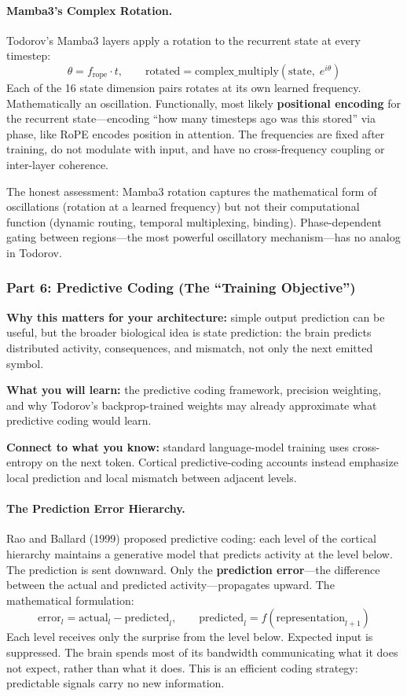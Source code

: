 \documentclass[11pt,a4paper]{article}
\begin{document}
\paragraph{Mamba3's Complex Rotation.}

Todorov's Mamba3 layers apply a rotation to the recurrent state at every timestep:
\[
  \theta = f_{\mathrm{rope}} \cdot t, \qquad
  \mathrm{rotated} = \mathrm{complex\_multiply}\!\left(\mathrm{state},\; e^{i\theta}\right)
\]
Each of the 16 state dimension pairs rotates at its own learned frequency. Mathematically an oscillation. Functionally, most likely \textbf{positional encoding} for the recurrent state---encoding ``how many timesteps ago was this stored'' via phase, like RoPE encodes position in attention. The frequencies are fixed after training, do not modulate with input, and have no cross-frequency coupling or inter-layer coherence.

The honest assessment: Mamba3 rotation captures the mathematical form of oscillations (rotation at a learned frequency) but not their computational function (dynamic routing, temporal multiplexing, binding). Phase-dependent gating between regions---the most powerful oscillatory mechanism---has no analog in Todorov.

\subsubsection{Part 6: Predictive Coding (The ``Training Objective'')}

\textbf{Why this matters for your architecture:} simple output prediction can be useful, but the broader biological idea is state prediction: the brain predicts distributed activity, consequences, and mismatch, not only the next emitted symbol.

\textbf{What you will learn:} the predictive coding framework, precision weighting, and why Todorov's backprop-trained weights may already approximate what predictive coding would learn.

\textbf{Connect to what you know:} standard language-model training uses cross-entropy on the next token. Cortical predictive-coding accounts instead emphasize local prediction and local mismatch between adjacent levels.

\paragraph{The Prediction Error Hierarchy.}

Rao and Ballard (1999) proposed predictive coding: each level of the cortical hierarchy maintains a generative model that predicts activity at the level below. The prediction is sent downward. Only the \textbf{prediction error}---the difference between the actual and predicted activity---propagates upward. The mathematical formulation:
\[
  \mathrm{error}_l = \mathrm{actual}_l - \mathrm{predicted}_l, \qquad
  \mathrm{predicted}_l = f(\mathrm{representation}_{l+1})
\]
Each level receives only the surprise from the level below. Expected input is suppressed. The brain spends most of its bandwidth communicating what it does not expect, rather than what it does. This is an efficient coding strategy: predictable signals carry no new information.
\end{document}
